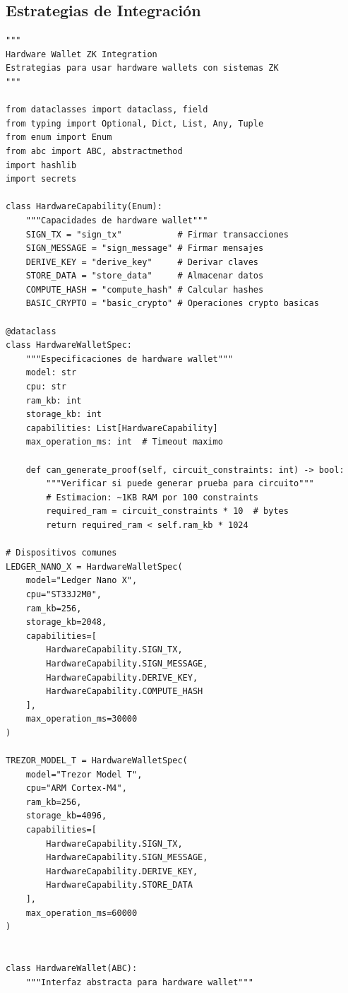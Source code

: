 \documentclass[11pt,a4paper,twoside]{book}
\theoremstyle{definition}
\theoremstyle{remark}
\begin{document}
\subsection{Estrategias de Integración}

\begin{lstlisting}[style=python, caption={Integración de hardware wallet con ZK}]
"""
Hardware Wallet ZK Integration
Estrategias para usar hardware wallets con sistemas ZK
"""

from dataclasses import dataclass, field
from typing import Optional, Dict, List, Any, Tuple
from enum import Enum
from abc import ABC, abstractmethod
import hashlib
import secrets

class HardwareCapability(Enum):
    """Capacidades de hardware wallet"""
    SIGN_TX = "sign_tx"           # Firmar transacciones
    SIGN_MESSAGE = "sign_message" # Firmar mensajes
    DERIVE_KEY = "derive_key"     # Derivar claves
    STORE_DATA = "store_data"     # Almacenar datos
    COMPUTE_HASH = "compute_hash" # Calcular hashes
    BASIC_CRYPTO = "basic_crypto" # Operaciones crypto basicas

@dataclass
class HardwareWalletSpec:
    """Especificaciones de hardware wallet"""
    model: str
    cpu: str
    ram_kb: int
    storage_kb: int
    capabilities: List[HardwareCapability]
    max_operation_ms: int  # Timeout maximo
    
    def can_generate_proof(self, circuit_constraints: int) -> bool:
        """Verificar si puede generar prueba para circuito"""
        # Estimacion: ~1KB RAM por 100 constraints
        required_ram = circuit_constraints * 10  # bytes
        return required_ram < self.ram_kb * 1024

# Dispositivos comunes
LEDGER_NANO_X = HardwareWalletSpec(
    model="Ledger Nano X",
    cpu="ST33J2M0",
    ram_kb=256,
    storage_kb=2048,
    capabilities=[
        HardwareCapability.SIGN_TX,
        HardwareCapability.SIGN_MESSAGE,
        HardwareCapability.DERIVE_KEY,
        HardwareCapability.COMPUTE_HASH
    ],
    max_operation_ms=30000
)

TREZOR_MODEL_T = HardwareWalletSpec(
    model="Trezor Model T",
    cpu="ARM Cortex-M4",
    ram_kb=256,
    storage_kb=4096,
    capabilities=[
        HardwareCapability.SIGN_TX,
        HardwareCapability.SIGN_MESSAGE,
        HardwareCapability.DERIVE_KEY,
        HardwareCapability.STORE_DATA
    ],
    max_operation_ms=60000
)


class HardwareWallet(ABC):
    """Interfaz abstracta para hardware wallet"""
    

\end{lstlisting}
\end{document}
